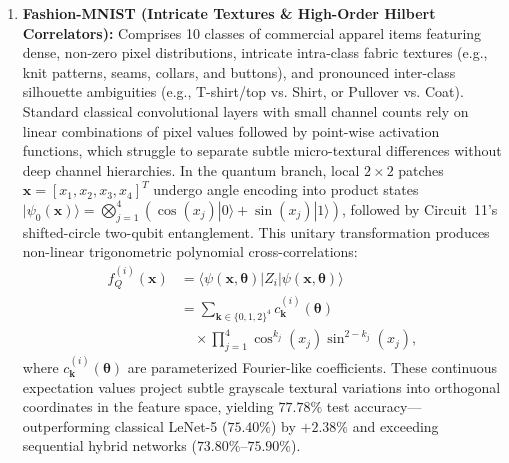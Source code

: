 \documentclass[journal]{IEEEtran}
\begin{document}
\begin{enumerate}
    \item \textbf{Fashion-MNIST (Intricate Textures \& High-Order Hilbert Correlators):} 
    Comprises 10 classes of commercial apparel items featuring dense, non-zero pixel distributions, intricate intra-class fabric textures (e.g., knit patterns, seams, collars, and buttons), and pronounced inter-class silhouette ambiguities (e.g., T-shirt/top vs. Shirt, or Pullover vs. Coat). Standard classical convolutional layers with small channel counts rely on linear combinations of pixel values followed by point-wise activation functions, which struggle to separate subtle micro-textural differences without deep channel hierarchies. 
    In the quantum branch, local $2 \times 2$ patches $\mathbf{x} = [x_1, x_2, x_3, x_4]^T$ undergo angle encoding into product states $|\psi_0(\mathbf{x})\rangle = \bigotimes_{j=1}^4 (\cos(x_j)|0\rangle + \sin(x_j)|1\rangle)$, followed by Circuit~11's shifted-circle two-qubit entanglement. This unitary transformation produces non-linear trigonometric polynomial cross-correlations:
    \begin{align}
    f_Q^{(i)}(\mathbf{x}) &= \langle \psi(\mathbf{x}, \boldsymbol{\theta}) | Z_i | \psi(\mathbf{x}, \boldsymbol{\theta}) \rangle \nonumber \\
    &= \sum_{\mathbf{k} \in \{0,1,2\}^4} c_{\mathbf{k}}^{(i)}(\boldsymbol{\theta}) \nonumber \\
    &\quad \times \prod_{j=1}^4 \cos^{k_j}(x_j) \sin^{2-k_j}(x_j),
    \label{eq:quantum_trig_correlator}
    \end{align}
    where $c_{\mathbf{k}}^{(i)}(\boldsymbol{\theta})$ are parameterized Fourier-like coefficients. These continuous expectation values project subtle grayscale textural variations into orthogonal coordinates in the feature space, yielding $77.78\%$ test accuracy---outperforming classical LeNet-5 ($75.40\%$) by $+2.38\%$ and exceeding sequential hybrid networks ($73.80\%$--$75.90\%$).


\end{enumerate}
\end{document}
